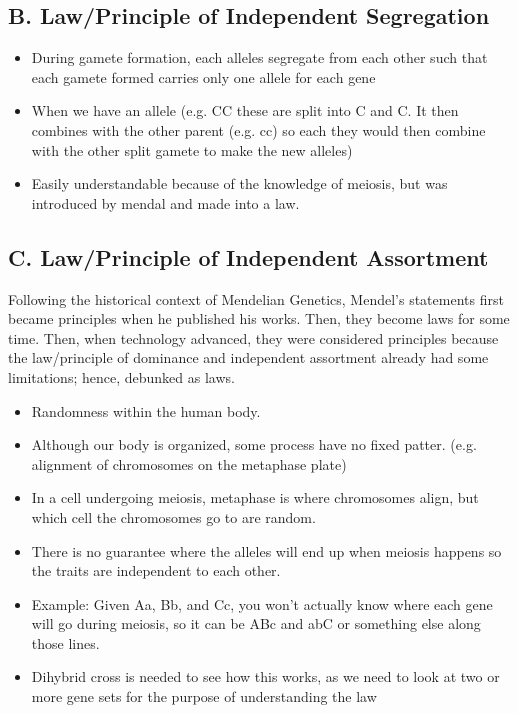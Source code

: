 \documentclass{article}
\begin{document}
\subsection*{B. Law/Principle of Independent Segregation}
\begin{itemize}
    \item During gamete formation, each alleles segregate from each other such that each gamete formed carries only one allele for each gene
    \item When we have an allele (e.g. CC these are split into C and C. It then combines with the other parent (e.g. cc) so each they would then combine with the other split gamete to make the new alleles)
    \item Easily understandable because of the knowledge of meiosis, but was introduced by mendal and made into a law.
\end{itemize}
\subsection*{C. Law/Principle of Independent Assortment}
Following the historical context of Mendelian Genetics, Mendel's statements first became principles when he published his works. Then, they become laws for some time. Then, when technology advanced, they were considered principles because the law/principle of dominance and independent assortment already had some limitations; hence, debunked as laws. 
\begin{itemize}
    \item Randomness within the human body.
    \item Although our body is organized, some process have no fixed patter. (e.g. alignment of chromosomes on the metaphase plate)
    \item In a cell undergoing meiosis, metaphase is where chromosomes align, but which cell the chromosomes go to are random.
    \item There is no guarantee where the alleles will end up when meiosis happens so the traits are independent to each other.
    \item Example: Given Aa, Bb, and Cc, you won't actually know where each gene will go during meiosis, so it can be ABc and abC or something else along those lines. 
    \item Dihybrid cross is needed to see how this works, as we need to look at two or more gene sets for the purpose of understanding the law
\end{itemize}
\end{document}
